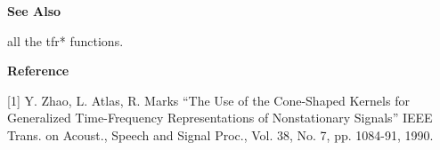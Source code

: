 {\bf \large {}\selectfont See Also}\\
\hspace*{1.5cm}
\begin{minipage}[t]{13.5cm}
all the {\ty tfr*} functions.
\end{minipage}
\vspace*{.5cm}


{\bf \large {}\selectfont Reference}\\
\hspace*{1.5cm}
\begin{minipage}[t]{13.5cm}
[1] Y. Zhao, L. Atlas, R. Marks ``The Use of the Cone-Shaped Kernels for
Generalized Time-Frequency Representations of Nonstationary Signals'' IEEE
Trans. on Acoust., Speech and Signal Proc., Vol. 38, No. 7, pp. 1084-91,
1990. 
\end{minipage}
